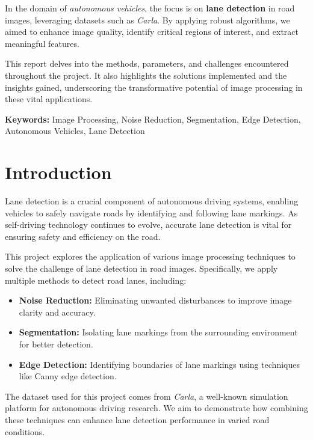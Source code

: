 \documentclass[12pt,a4paper]{article}
\begin{document}
In the domain of \textit{autonomous vehicles}, the focus is on \textbf{lane detection} in road images, leveraging datasets such as \textit{Carla}. By applying robust algorithms, we aimed to enhance image quality, identify critical regions of interest, and extract meaningful features.

This report delves into the methods, parameters, and challenges encountered throughout the project. It also highlights the solutions implemented and the insights gained, underscoring the transformative potential of image processing in these vital applications.

\vspace{0.5cm}
\noindent \textbf{Keywords:} Image Processing, Noise Reduction, Segmentation, Edge Detection, Autonomous Vehicles, Lane Detection

\newpage %
\section{Introduction}


Lane detection is a crucial component of autonomous driving systems, enabling vehicles to safely navigate roads by identifying and following lane markings. As self-driving technology continues to evolve, accurate lane detection is vital for ensuring safety and efficiency on the road.

This project explores the application of various image processing techniques to solve the challenge of lane detection in road images. Specifically, we apply multiple methods to detect road lanes, including:
\begin{itemize}
    \item \textbf{Noise Reduction:} Eliminating unwanted disturbances to improve image clarity and accuracy.
    \item \textbf{Segmentation:} Isolating lane markings from the surrounding environment for better detection.
    \item \textbf{Edge Detection:} Identifying boundaries of lane markings using techniques like Canny edge detection.
\end{itemize}

The dataset used for this project comes from \textit{Carla}, a well-known simulation platform for autonomous driving research. We aim to demonstrate how combining these techniques can enhance lane detection performance in varied road conditions.
\end{document}

